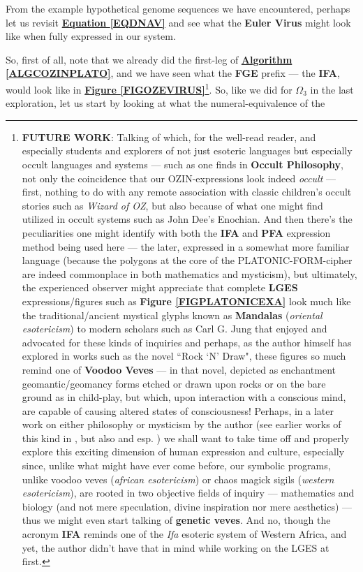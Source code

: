 \documentclass[a4paper, 18pt]{book} %
\begin{document}
From the example hypothetical genome sequences we have encountered, perhaps let us revisit \textbf{\hyperref[EQDNAV]{Equation \ref{EQDNAV}}} and see what the \textbf{Euler Virus} might look like when fully expressed in our system.

So, first of all, note that we already did the first-leg of \textbf{\hyperref[ALGCOZINPLATO]{Algorithm \ref{ALGCOZINPLATO}}}, and we have seen what the \textbf{FGE} prefix --- the \textbf{IFA}, would look like in \textbf{\hyperref[FIGOZEVIRUS]{Figure \ref{FIGOZEVIRUS}}}\footnote{\textbf{FUTURE WORK}: Talking of which, for the well-read reader, and especially students and explorers of not just esoteric languages but especially occult languages and systems --- such as one finds in \textbf{Occult Philosophy}\cite{agrippa2014occult}, not only the coincidence that our OZIN-expressions look indeed \textit{occult} --- first, nothing to do with any remote association with classic children's occult stories such as \textit{Wizard of OZ}, but also because of what one might find utilized in occult systems such as John Dee's Enochian\cite{lutalo2025unraveling}\cite{lutalo_2025_grimlumtauto}. And then there's the peculiarities one might identify with both the \textbf{IFA} and \textbf{PFA} expression method being used here --- the later, expressed in a somewhat more familiar language (because the polygons at the core of the PLATONIC-FORM-cipher are indeed commonplace in both mathematics and mysticism), but ultimately, the experienced observer might appreciate that complete \textbf{LGES} expressions/figures such as \textbf{Figure \ref{FIGPLATONICEXA}} look much like the traditional/ancient mystical glyphs known as \textbf{Mandalas} (\textit{oriental esotericism}) to modern scholars such as Carl G. Jung that enjoyed and advocated for these kinds of inquiries\cite{jung1964symbols} and perhaps, as the author himself has explored in works such as the novel ``Rock `N' Draw"\cite{lutalo2025rock}, these figures so much remind one of \textbf{Voodoo Veves} --- in that novel, depicted as enchantment geomantic/geomancy forms etched or drawn upon rocks or on the bare ground as in child-play, but which, upon interaction with a conscious mind, are capable of causing altered states of consciousness! Perhaps, in a later work on either philosophy or mysticism by the author (see earlier works of this kind in \cite{lutalo2025concerning_trans}, but also \cite{Lutalo2025transpsy} and esp. \cite{lutalo_2025_grimlumtauto}) we shall want to take time off and properly explore this exciting dimension of human expression and culture, especially since, unlike what might have ever come before, our symbolic programs, unlike voodoo veves (\textit{african esotericism}) or chaos magick sigils (\textit{western esotericism}), are rooted in two objective fields of inquiry --- mathematics and biology (and not mere speculation, divine inspiration nor mere aesthetics) --- thus we might even start talking of \textbf{genetic veves}. And no, though the acronym \textbf{IFA} reminds one of the \textit{Ifa} esoteric system of  Western Africa, and yet, the author didn't have that in mind while working on the LGES at first.}. So, like we did for $\Omega_{3}$ in the last exploration, let us start by looking at what the numeral-equivalence of the 
\end{document}
